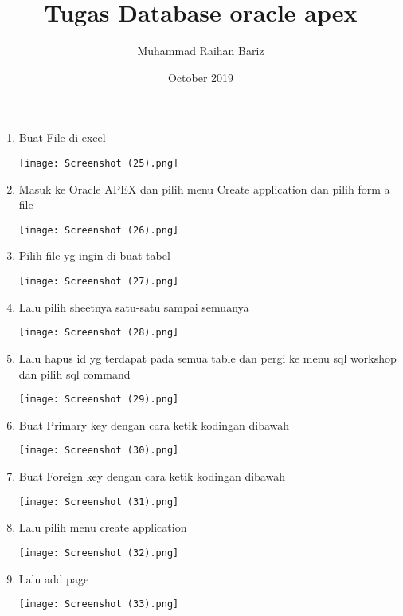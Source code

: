 \documentclass{article}
\title{Tugas Database oracle apex}
\author{Muhammad Raihan Bariz}
\date{October 2019}
\begin{document}
\maketitle
\begin{enumerate}
    \item Buat File di excel
    \begin{center}
       \texttt{[image: Screenshot (25).png]}
    \end{center}
    \item Masuk ke Oracle APEX dan pilih menu Create application dan pilih form a file
    \begin{center}
        \texttt{[image: Screenshot (26).png]}
    \end{center}
    \item Pilih file yg ingin di buat tabel
    \begin{center}
        \texttt{[image: Screenshot (27).png]}
    \end{center}
    \item Lalu pilih sheetnya satu-satu sampai semuanya
    \begin{center}
        \texttt{[image: Screenshot (28).png]}
    \end{center}
    \item Lalu hapus id yg terdapat pada semua table dan pergi ke menu sql workshop dan pilih sql command
    \begin{center}
        \texttt{[image: Screenshot (29).png]}
    \end{center}
    \item Buat Primary key dengan cara ketik kodingan dibawah
    \begin{center}
        \texttt{[image: Screenshot (30).png]}
    \end{center}
    \item Buat Foreign key dengan cara ketik kodingan dibawah
    \begin{center}
        \texttt{[image: Screenshot (31).png]}
    \end{center}
    \item Lalu pilih menu create application
    \begin{center}
        \texttt{[image: Screenshot (32).png]}
    \end{center}
    \item Lalu add page
        \begin{center}
            \texttt{[image: Screenshot (33).png]}

\end{center}
\end{enumerate}
\end{document}
